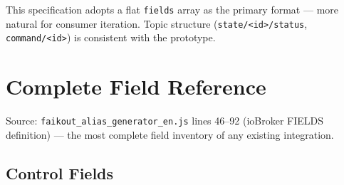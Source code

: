 \documentclass[11pt,a4paper]{article}
\newcommand{\topic}[1]{\texttt{\color{accent}#1}}
\begin{document}
This specification adopts a flat \texttt{fields} array as the primary format — more natural for consumer iteration. Topic structure (\topic{state/\textless id\textgreater/status}, \topic{command/\textless id\textgreater}) is consistent with the prototype.

\section{Complete Field Reference}
\label{app:fields}

Source: \texttt{faikout\_alias\_generator\_en.js} lines 46–92 (ioBroker FIELDS definition) — the most complete field inventory of any existing integration.

\subsection{Control Fields}
\end{document}
